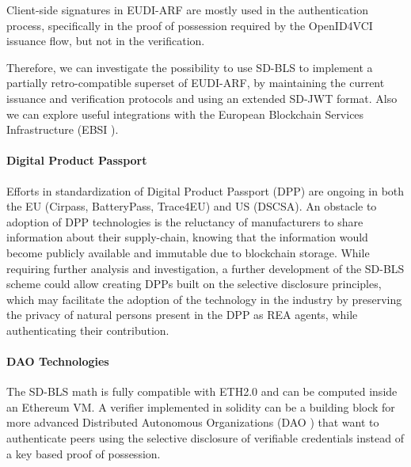 Client-side signatures in EUDI-ARF are mostly used in the
authentication process, specifically in the proof of possession
required by the OpenID4VCI\cite{OID4VCI} issuance flow, but not in the
verification.

Therefore, we can investigate the possibility to use SD-BLS to
implement a partially retro-compatible superset of EUDI-ARF, by
maintaining the current issuance and verification protocols and using
an extended SD-JWT format. Also we can explore useful integrations
with the European Blockchain Services Infrastructure (EBSI
\cite{ebsi}).

\paragraph{Digital Product Passport}
Efforts in standardization of Digital Product Passport (DPP) are
ongoing in both the EU (Cirpass, BatteryPass, Trace4EU) and US
(DSCSA). An obstacle to adoption of DPP technologies is the reluctancy
of manufacturers to share information about their supply-chain,
knowing that the information would become publicly available and
immutable due to blockchain storage. While requiring further analysis
and investigation, a further development of the SD-BLS scheme could
allow creating DPPs built on the selective disclosure principles,
which may facilitate the adoption of the technology in the industry by
preserving the privacy of natural persons present in the DPP as REA
agents\cite{reflow}, while authenticating their contribution.

\paragraph{DAO Technologies}
The SD-BLS math is fully compatible with ETH2.0 and can be computed
inside an Ethereum VM. A verifier implemented in solidity can be a
building block for more advanced Distributed Autonomous Organizations
(DAO \cite{dao}) that want to authenticate peers using the selective
disclosure of verifiable credentials instead of a key based proof of
possession.






